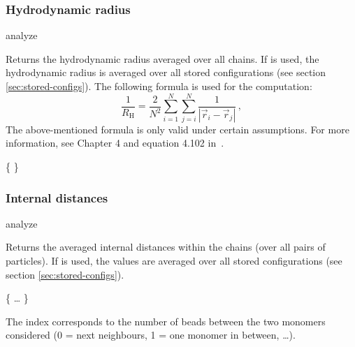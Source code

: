 \subsubsection{Hydrodynamic radius}
\begin{pysyntax}
\end{pysyntax}
\begin{essyntax}
  analyze  
\end{essyntax}
Returns the hydrodynamic radius averaged over all chains.  
If  is used, the hydrodynamic radius is averaged over all stored
configurations (see section \vref{sec:stored-configs}).
The following formula is used for the computation:
\begin{equation}
\label{eq:Rh}
\frac{1}{R_{\mathrm H}} = \frac{2}{N^2} \sum\limits_{i=1}^{N} \sum\limits_{j=i}^{N} \frac{1}{|\vec r_i - \vec r_j|}\,,
\end{equation}
The above-mentioned formula is only valid under certain assumptions.
For more information, see Chapter 4 and equation 4.102 in~\cite{doi86a}.
\begin{code}
\{   \}
\end{code}

\subsubsection{Internal distances}
\begin{essyntax}
 analyze  
\end{essyntax}
Returns the averaged internal distances within the chains (over
all pairs of particles).  
If  is used, the values are averaged over all stored
configurations (see section \vref{sec:stored-configs}).
\begin{code}
\{   \dots {} \}
\end{code}
The index corresponds to the number of beads between the two monomers
considered (0 = next neighbours, 1 = one monomer in between, \dots).

